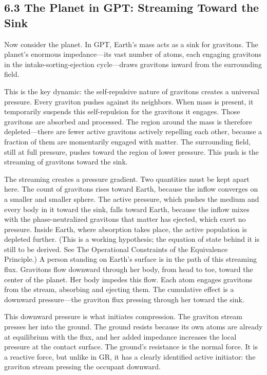 \documentclass[11pt]{article}
\begin{document}
\subsection{6.3 The Planet in GPT: Streaming Toward the Sink}

Now consider the planet. In GPT, Earth's mass acts as a sink for gravitons. The planet's enormous impedance---its vast number of atoms, each engaging gravitons in the intake-sorting-ejection cycle---draws gravitons inward from the surrounding field.

This is the key dynamic: the self-repulsive nature of gravitons creates a universal pressure. Every graviton pushes against its neighbors. When mass is present, it temporarily suspends this self-repulsion for the gravitons it engages. Those gravitons are absorbed and processed. The region around the mass is therefore depleted---there are fewer active gravitons actively repelling each other, because a fraction of them are momentarily engaged with matter. The surrounding field, still at full pressure, pushes toward the region of lower pressure. This push is the streaming of gravitons toward the sink.

The streaming creates a pressure gradient. Two quantities must be kept apart here. The count of gravitons rises toward Earth, because the inflow converges on a smaller and smaller sphere. The active pressure, which pushes the medium and every body in it toward the sink, falls toward Earth, because the inflow mixes with the phase-neutralized gravitons that matter has ejected, which exert no pressure. Inside Earth, where absorption takes place, the active population is depleted further. (This is a working hypothesis; the equation of state behind it is still to be derived. See The Operational Constraints of the Equivalence Principle.) A person standing on Earth's surface is in the path of this streaming flux. Gravitons flow downward through her body, from head to toe, toward the center of the planet. Her body impedes this flow. Each atom engages gravitons from the stream, absorbing and ejecting them. The cumulative effect is a downward pressure---the graviton flux pressing through her toward the sink.

This downward pressure is what initiates compression. The graviton stream presses her into the ground. The ground resists because its own atoms are already at equilibrium with the flux, and her added impedance increases the local pressure at the contact surface. The ground's resistance is the normal force. It is a reactive force, but unlike in GR, it has a clearly identified active initiator: the graviton stream pressing the occupant downward.
\end{document}
